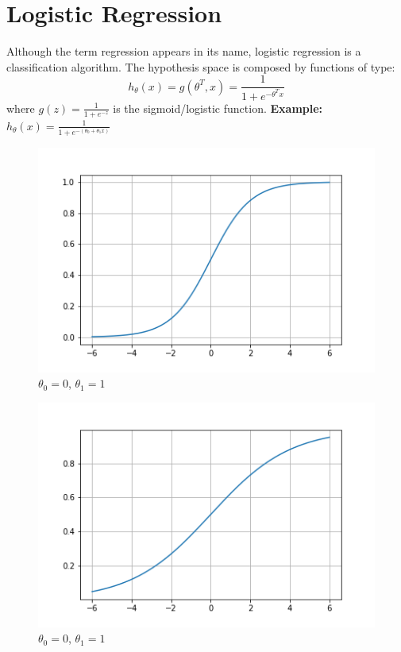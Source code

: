 \section{Logistic Regression}
Although the term regression appears in its name, logistic regression is a classification algorithm.
The hypothesis space is composed by functions of type:
\[h_{\theta}(x) = g(\theta^{T},x) = \frac{1}{1 + e^{-\theta^{T}x}}\]
where $g(z) = \frac{1}{1 + e^{-z}}$ is the sigmoid/logistic function.\newline
\textbf{Example:} $h_{\theta}(x) = \frac{1}{1 + e^{-(\theta_{0} + \theta_{1}x)}}$
\begin{figure}[h]
    \centering    
    \includegraphics[scale=0.5]{images/sigmoid.png}
    \caption{$\theta_{0} = 0$, $\theta_{1} = 1$}
    \label{fig:sigmoid}
\end{figure}
\begin{figure}[h]
    \centering
    \includegraphics[scale=0.5]{images/sigmoid_1.png}
    \caption{$\theta_{0} = 0$, $\theta_{1} = 1$}
    \label{fig:sigmoid_1}
\end{figure} \newline
